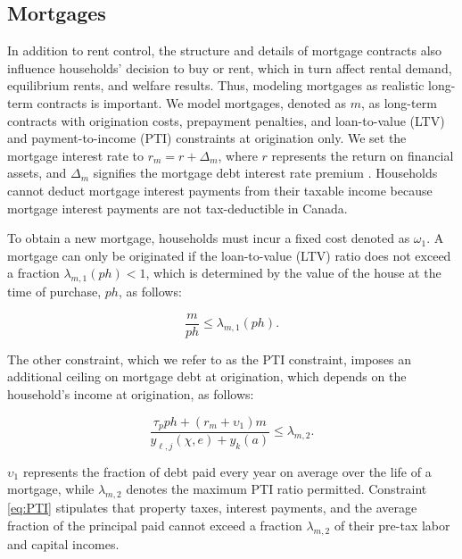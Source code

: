 \documentclass[parskip=full]{article}
\begin{document}
\subsection{Mortgages}\label{subsection:morgtages}

In addition to rent control, the structure and details of mortgage contracts also influence households' decision to buy or rent, which in turn affect rental demand, equilibrium rents, and welfare results. Thus, modeling mortgages as realistic long-term contracts is important. We model mortgages, denoted as $m$, as long-term contracts with origination costs, prepayment penalties, and loan-to-value (LTV) and payment-to-income (PTI) constraints at origination only. We set the mortgage interest rate to $r_{m}=r+\Delta_m$, where $r$ represents the return on financial assets, and $\Delta_m$ signifies the mortgage debt interest rate premium \citep{sommeretal-2013,sommersullivan-2017,kaplanetal-2019}. Households cannot deduct mortgage interest payments from their taxable income because mortgage interest payments are not tax-deductible in Canada.

To obtain a new mortgage, households must incur a fixed cost denoted as $\omega_{1}$. A mortgage can only be originated if the loan-to-value (LTV) ratio does not exceed a fraction $\lambda_{m,1}(ph)<1$, which is determined by the value of the house at the time of purchase, $ph$, as follows:

\begin{equation}\label{eq:LTV}
\frac{m}{p h} \leq \lambda_{m,1}(ph).
\end{equation}

\noindent The other constraint, which we refer to as the PTI constraint, imposes an additional ceiling on mortgage debt at origination, which depends on the household's income at origination, as follows:

\begin{equation}\label{eq:PTI}
\frac{\tau_{p}ph+(r_{m}+\upsilon_{1})m}{y_{\ell,j}(\chi,e)+y_{k}(a)} \leq \lambda_{m,2}.
\end{equation}

\noindent $\upsilon_{1}$ represents the fraction of debt paid every year on average over the life of a mortgage, while $\lambda_{m,2}$ denotes the maximum PTI ratio permitted. Constraint \eqref{eq:PTI} stipulates that property taxes, interest payments, and the average fraction of the principal paid cannot exceed a fraction $\lambda_{m,2}$ of their pre-tax labor and capital incomes.
\end{document}
